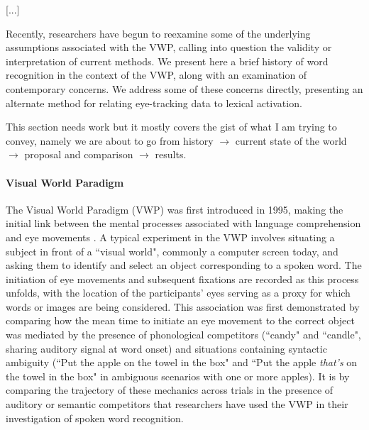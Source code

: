 \documentclass{article}
\begin{document}
[...]

Recently, researchers have begun to reexamine some of the underlying assumptions associated with the VWP, calling into question the validity or interpretation of current methods. We present here a brief history of word recognition in the context of the VWP, along with an examination of contemporary concerns. We address some of these concerns directly, presenting an alternate method for relating eye-tracking data to lexical activation.


This section needs work but it mostly covers the gist of what I am trying to convey, namely we are about to go from history $\rightarrow$ current state of the world $\rightarrow$ proposal and comparison $\rightarrow$ results.




\paragraph{Visual World Paradigm} The Visual World Paradigm (VWP) was first introduced in 1995, making the initial link between the mental processes associated with language comprehension and eye movements \cite{tanenhaus1995integration}. A typical experiment in the VWP involves situating a subject in front of a ``visual world", commonly a computer screen today, and asking them to identify and select an object corresponding to a spoken word. The initiation of eye movements and subsequent fixations are recorded as this process unfolds, with the location of the participants' eyes serving as a proxy for which words or images are being considered. This association was first demonstrated by comparing how the mean time to initiate an eye movement to the correct object was mediated by the presence of phonological competitors (``candy" and ``candle", sharing auditory signal at word onset) and situations containing syntactic ambiguity (``Put the apple on the towel in the box" and ``Put the apple \textit{that's} on the towel in the box" in ambiguous scenarios with one or more apples). It is by comparing the trajectory of these mechanics across trials in the presence of auditory or semantic competitors that researchers have used the VWP in their investigation of spoken word recognition.
\end{document}

